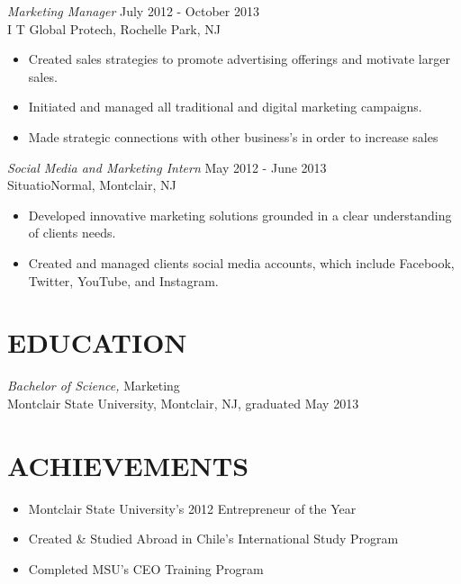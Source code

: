 \documentclass[margin]{res}
\begin{document}
\begin{resume}
                {\sl Marketing Manager} \hfill July 2012 - October 2013 \\
                I T Global Protech, Rochelle Park, NJ
                 \begin{itemize}  \itemsep -2pt %
                 \item Created sales strategies to promote advertising offerings and motivate larger sales.
                 \item Initiated and managed all traditional and digital marketing campaigns.
                 \item Made strategic connections with other business's in order to increase sales
                 \end{itemize}
                 
               {\sl Social Media and Marketing Intern} \hfill            May 2012 - June 2013 \\
                SituatioNormal, Montclair, NJ
                 \begin{itemize}  \itemsep -2pt %
                 \item Developed innovative marketing solutions grounded in a clear understanding of clients needs.
                 \item Created and managed clients social media accounts, which include Facebook, Twitter,
                 YouTube, and Instagram.
                 \end{itemize} 
 
\section{EDUCATION} {\sl Bachelor of Science,} Marketing \\
                Montclair State University, Montclair, NJ, 
                graduated May 2013 \vspace{0.1pt}
\section{ACHIEVEMENTS}
\begin{itemize} 

		\item Montclair State University's 2012 Entrepreneur of the Year
		\item Created \& Studied Abroad in Chile's International Study Program
		\item Completed MSU's CEO Training Program 
					                
					                 
\end{itemize}

\end{resume}
\end{document}
